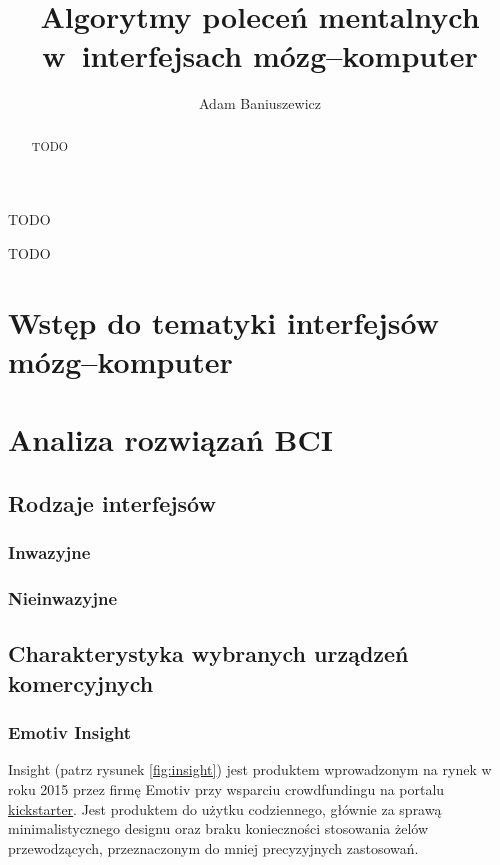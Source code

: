 \documentclass[skorowidz,skroty]{dyplomWEZUT}
\author{Adam Baniuszewicz}
\title{Algorytmy poleceń mentalnych w~interfejsach mózg--komputer}
\begin{document}
\begin{streszczenie}
TODO
\end{streszczenie}

\begin{abstract}
TODO
\end{abstract}

\maketitle

\begin{wprowadzenie}

TODO

\end{wprowadzenie}



\chapter{Wstęp do tematyki interfejsów mózg--komputer}

\chapter{Analiza rozwiązań BCI}
\section{Rodzaje interfejsów}
\subsection{Inwazyjne}
\subsection{Nieinwazyjne}
\section{Charakterystyka wybranych urządzeń komercyjnych}
\subsection{Emotiv Insight\label{subsection:insight}}
Insight (patrz rysunek \vref{fig:insight}) jest produktem wprowadzonym na rynek w roku 2015 przez firmę Emotiv przy wsparciu crowdfundingu na portalu \href{www.kickstarter.com}{kickstarter}. Jest produktem do użytku codziennego, głównie za sprawą minimalistycznego designu oraz braku konieczności stosowania żelów przewodzących, przeznaczonym do mniej precyzyjnych zastosowań.
\end{document}
